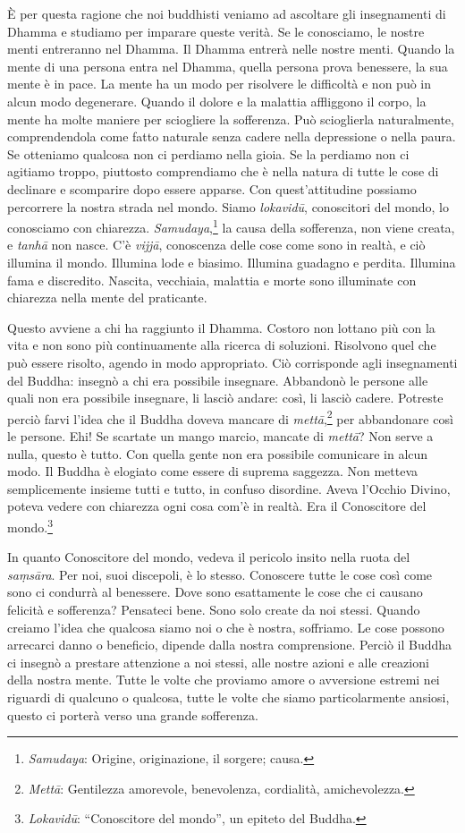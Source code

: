 È per questa ragione che noi buddhisti veniamo ad ascoltare gli
insegnamenti di Dhamma e studiamo per imparare queste verità. Se le
conosciamo, le nostre menti entreranno nel Dhamma. Il Dhamma entrerà
nelle nostre menti. Quando la mente di una persona entra nel Dhamma,
quella persona prova benessere, la sua mente è in pace. La mente ha un
modo per risolvere le difficoltà e non può in alcun modo degenerare.
Quando il dolore e la malattia affliggono il corpo, la mente ha molte
maniere per sciogliere la sofferenza. Può scioglierla naturalmente,
comprendendola come fatto naturale senza cadere nella depressione o
nella paura. Se otteniamo qualcosa non ci perdiamo nella gioia. Se la
perdiamo non ci agitiamo troppo, piuttosto comprendiamo che è nella
natura di tutte le cose di declinare e scomparire dopo essere apparse.
Con quest'attitudine possiamo percorrere la nostra strada nel mondo.
Siamo \emph{lokavidū}, conoscitori del mondo, lo conosciamo con
chiarezza. \emph{Samudaya},\footnote{%
  \emph{Samudaya}: Origine, originazione, il sorgere; causa.}
la causa della sofferenza, non viene
creata, e \emph{tanhā} non nasce. C'è \emph{vijjā}, conoscenza delle
cose come sono in realtà, e ciò illumina il mondo. Illumina lode e
biasimo. Illumina guadagno e perdita. Illumina fama e discredito.
Nascita, vecchiaia, malattia e morte sono illuminate con chiarezza nella
mente del praticante.

Questo avviene a chi ha raggiunto il Dhamma. Costoro non lottano più con
la vita e non sono più continuamente alla ricerca di soluzioni.
Risolvono quel che può essere risolto, agendo in modo appropriato. Ciò
corrisponde agli insegnamenti del Buddha: insegnò a chi era possibile
insegnare. Abbandonò le persone alle quali non era possibile insegnare,
li lasciò andare: così, li lasciò cadere. Potreste perciò farvi l'idea
che il Buddha doveva mancare di \emph{mettā},\footnote{\emph{Mettā}:
  Gentilezza amorevole, benevolenza, cordialità, amichevolezza.} per
abbandonare così le persone. Ehi! Se scartate un mango marcio, mancate
di \emph{mettā}? Non serve a nulla, questo è tutto. Con quella gente non
era possibile comunicare in alcun modo. Il Buddha è elogiato come essere
di suprema saggezza. Non metteva semplicemente insieme tutti e tutto, in
confuso disordine. Aveva l'Occhio Divino, poteva vedere con chiarezza
ogni cosa com'è in realtà. Era il Conoscitore del mondo.\footnote{\emph{Lokavidū}:
  ``Conoscitore del mondo'', un epiteto del Buddha.}

In quanto Conoscitore del mondo, vedeva il pericolo insito nella ruota
del \emph{saṃsāra}. Per noi, suoi discepoli, è lo stesso. Conoscere
tutte le cose così come sono ci condurrà al benessere. Dove sono
esattamente le cose che ci causano felicità e sofferenza? Pensateci
bene. Sono solo create da noi stessi. Quando creiamo l'idea che qualcosa
siamo noi o che è nostra, soffriamo. Le cose possono arrecarci danno o
beneficio, dipende dalla nostra comprensione. Perciò il Buddha ci
insegnò a prestare attenzione a noi stessi, alle nostre azioni e alle
creazioni della nostra mente. Tutte le volte che proviamo amore o
avversione estremi nei riguardi di qualcuno o qualcosa, tutte le volte
che siamo particolarmente ansiosi, questo ci porterà verso una grande
sofferenza.

